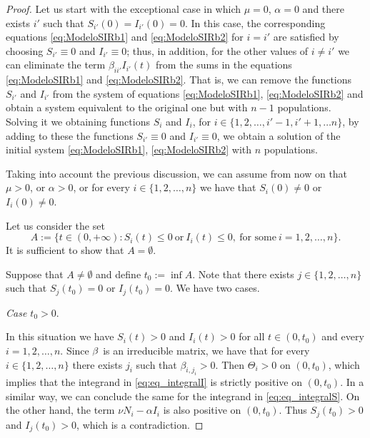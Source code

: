 \documentclass[a4paper,10pt]{article}
\theoremstyle{remark}
\begin{document}
\begin{proof} 
Let us start with the exceptional case in which $\mu=0$, $\alpha=0$ and there exists $i'$ such that $S_{i'}(0)=I_{i'}(0)=0$. In this case,  the corresponding equations \eqref{eq:ModeloSIRb1} and \eqref{eq:ModeloSIRb2} for $i=i'$ are satisfied by choosing $S_{i'}\equiv 0$ and $I_{i'}\equiv 0$;  thus, in addition, for the other values of $i\neq i'$ we can eliminate the term $\beta_{ii'}I_{i'}(t)$ from the sums in the equations \eqref{eq:ModeloSIRb1} and \eqref{eq:ModeloSIRb2}. That is, we can remove the functions $S_{i'}$ and $I_{i'}$ from the system of equations \eqref{eq:ModeloSIRb1}, \eqref{eq:ModeloSIRb2} and obtain a system equivalent to the original one but with $n-1$ populations. Solving it we obtaining functions $S_{i}$ and $I_i$, for $i\in\{1,2,\ldots,i'-1,i'+1,\ldots n\}$, by adding to these the functions $S_{i'}\equiv 0$ and $I_{i'}\equiv 0$, we obtain a solution of the initial system \eqref{eq:ModeloSIRb1}, \eqref{eq:ModeloSIRb2} with $n$ populations.

Taking into account the previous discussion, we can assume from now on that $\mu>0$, or $\alpha>0$, or for every $i\in\{1,2,\ldots,n\}$ we have that $S_i(0)\neq 0$ or $I_i(0)\neq 0$.


Let us consider the set
$$A:=\{t\in (0,+\infty): S_i(t)\leq 0\ \text{or}\ I_i(t)\leq 0,\ \text{for some}\ i=1,2,\ldots,n\}.$$
It is sufficient to show that $A=\emptyset$. 

Suppose that $A\neq \emptyset$ and define $t_0:=\inf A$.
Note that there exists $j\in \{1,2,\ldots,n\}$ such that $S_j(t_0)=0$ or $I_j(t_0)=0$.  We have two cases. 

\emph{Case $t_0>0.$} 

In this situation we have  $S_i(t)>0$ and $I_i(t)>0$ for all $t\in (0,t_0)$ and every $i=1,2,\ldots,n$. Since $\bold{\beta}$ is an irreducible matrix, we have that for every $i\in\{1,2,\ldots,n\}$ there exists $j_i$ such that $\beta_{i,j_i}>0$. Then $\Theta_i>0$ on $(0,t_0)$, which implies that the integrand in \eqref{eq:eq_integralI} is strictly positive on $(0,t_0)$. In a similar way, we can conclude the same for the integrand in \eqref{eq:eq_integralS}. On the other hand, the term $\nu N_i-\alpha I_i$ is also positive on $(0,t_0)$. Thus $S_j(t_0)>0$ and $I_j(t_0)>0$, which is a contradiction.


\end{proof}
\end{document}

